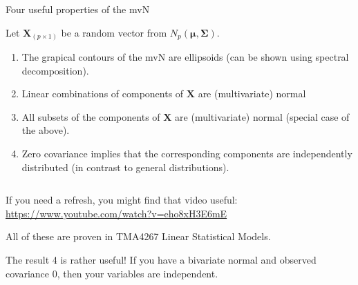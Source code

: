 \documentclass[ignorenonframetext,]{beamer}
\begin{document}
\begin{frame}

\begin{block}{Four useful properties of the mvN}

\vspace{2mm}

Let \(\boldsymbol{X}_{(p\times 1)}\) be a random vector from
\(N_p(\boldsymbol{\mu},\boldsymbol\Sigma)\).

\vspace{2mm}

\begin{enumerate}
\item
  The grapical contours of the mvN are ellipsoids (can be shown using
  spectral decomposition).
\item
  Linear combinations of components of \(\boldsymbol{X}\) are
  (multivariate) normal
\item
  All subsets of the components of \(\boldsymbol{X}\) are (multivariate)
  normal (special case of the above).
\item
  Zero covariance implies that the corresponding components are
  independently distributed (in contrast to general distributions).
\end{enumerate}

\(~\)

\small

If you need a refresh, you might find that video useful:
\url{https://www.youtube.com/watch?v=eho8xH3E6mE}

\end{block}

\end{frame}

\begin{frame}

All of these are proven in TMA4267 Linear Statistical Models.

The result 4 is rather useful! If you have a bivariate normal and
observed covariance 0, then your variables are independent.

\end{frame}
\end{document}
